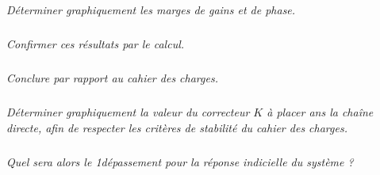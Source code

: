 \documentclass[10pt,fleqn]{article} %
\begin{document}
\begin{multicols}{2}
\subparagraph{}\textit{Déterminer graphiquement les marges de gains et de phase.}
\ifprof
\begin{corrige}
\end{corrige}
\else
\fi

\subparagraph{}\textit{Confirmer ces résultats par le calcul.}
\ifprof
\begin{corrige}
\end{corrige}
\else
\fi

\subparagraph{}\textit{Conclure par rapport au cahier des charges.}
\ifprof
\begin{corrige}
\end{corrige}
\else
\fi

\subparagraph{}\textit{Déterminer graphiquement la valeur du correcteur $K$ à placer ans la chaîne directe, afin de respecter les critères de stabilité du cahier des charges.}
\ifprof
\begin{corrige}
\end{corrige}
\else
\fi

\subparagraph{}\textit{Quel sera alors le 1\ier dépassement pour la réponse indicielle du système ?}
\ifprof
\begin{corrige}
\end{corrige}
\else
\fi

\end{multicols}
%
%
%
\end{document}
